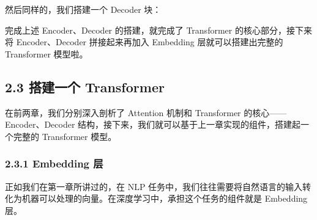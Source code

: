 \documentclass[12pt,a4paper]{book}
\begin{document}
然后同样的，我们搭建一个 Decoder 块：

\begin{Shaded}
\begin{Highlighting}[]
     \NormalTok{(}
        \NormalTok{() }
        \OperatorTok{=}\NormalTok{ nn.ModuleList([DecoderLayer(args) }\NormalTok{ \_ } \NormalTok{(args.n\_layer)])}
        \OperatorTok{=}

         
\OperatorTok{=}
         
\end{Highlighting}
\end{Shaded}

完成上述 Encoder、Decoder 的搭建，就完成了 Transformer
的核心部分，接下来将 Encoder、Decoder 拼接起来再加入 Embedding
层就可以搭建出完整的 Transformer 模型啦。

\subsection{2.3 搭建一个
Transformer}\label{ux642dux5efaux4e00ux4e2a-transformer}

在前两章，我们分别深入剖析了 Attention 机制和 Transformer
的核心------Encoder、Decoder
结构，接下来，我们就可以基于上一章实现的组件，搭建起一个完整的
Transformer 模型。

\subsubsection{2.3.1 Embedding 层}\label{embedding-ux5c42}

正如我们在第一章所讲过的，在 NLP
任务中，我们往往需要将自然语言的输入转化为机器可以处理的向量。在深度学习中，承担这个任务的组件就是
Embedding 层。
\end{document}
